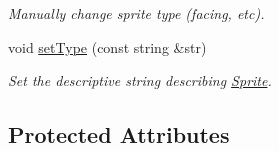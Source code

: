 \begin{DoxyCompactItemize}
\begin{DoxyCompactList}\small\item\em Manually change sprite type (facing, etc). \end{DoxyCompactList}\item 
void \hyperlink{class_sprite_a0c2efc62131a56a1c81405527a930b71}{set\+Type} (const string \&str)\hypertarget{class_sprite_a0c2efc62131a56a1c81405527a930b71}{}\label{class_sprite_a0c2efc62131a56a1c81405527a930b71}

\begin{DoxyCompactList}\small\item\em Set the descriptive string describing \hyperlink{class_sprite}{Sprite}. \end{DoxyCompactList}\end{DoxyCompactItemize}
\subsection*{Protected Attributes}
